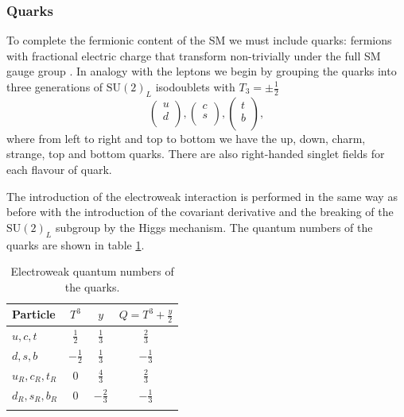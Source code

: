 \subsubsection{Quarks}
To complete the fermionic content of the SM we must include quarks: fermions with fractional electric charge that transform non-trivially under the full SM gauge group \cite{PDG}. 
In analogy with the leptons we begin by grouping the quarks into three generations of $\mathrm{SU}(2)_{L}$ isodoublets with $T_{3} = \pm\frac{1}{2}$
\begin{equation}
    \label{eq:theory:quark_isodoublets}
    \begin{pmatrix}
        u \\
        d \\
    \end{pmatrix},
    \begin{pmatrix}
        c \\
        s \\
    \end{pmatrix},
    \begin{pmatrix}
        t \\
        b \\
    \end{pmatrix},
\end{equation}
where from left to right and top to bottom we have the up, down, charm, strange, top and bottom quarks. There are also right-handed singlet fields for each flavour of quark. 

The introduction of the electroweak interaction is performed in the same way as before with the introduction of the covariant derivative and the breaking of the $\mathrm{SU}(2)_{L}$ subgroup by the Higgs mechanism. The quantum numbers of the quarks are shown in table \ref{tab:theory:elecroweak_qn_quarks}.
\begin{table}[h!]
    \centering
\renewcommand{\arraystretch}{1.3}
\begin{tabular}{ l | c c c }
    \thickhline
    Particle & $T^{3}$ & $y$ & $Q = T^3 + \frac{y}{2}$ \\
    \hline
    $u,c,t$ & $\frac{1}{2}$ & $\frac{1}{3}$ & $\frac{2}{3}$\\ 
    $d,s,b$ & $-\frac{1}{2}$ & $\frac{1}{3}$ & $-\frac{1}{3}$\\ 
    $u_{R},c_{R},t_{R}$    & $0$ & $\frac{4}{3}$ & $\frac{2}{3}$\\ 
    $d_{R},s_{R},b_{R}$    & $0$ & $-\frac{2}{3}$ & $-\frac{1}{3}$\\ 
    \thickhline
\end{tabular}%
\caption{Electroweak quantum numbers of the quarks.}
\label{tab:theory:elecroweak_qn_quarks}
\end{table}

